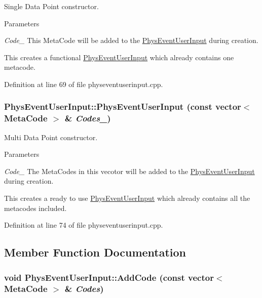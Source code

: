 Single Data Point constructor. 
\begin{DoxyParams}{Parameters}
\item[{\em Code\_\-}]This MetaCode will be added to the \hyperlink{classPhysEventUserInput}{PhysEventUserInput} during creation.\end{DoxyParams}
This creates a functional \hyperlink{classPhysEventUserInput}{PhysEventUserInput} which already contains one metacode. 

Definition at line 69 of file physeventuserinput.cpp.\hypertarget{classPhysEventUserInput_a0a9bd99d8db6f171ef3c87bd417ccc4a}{
\subsubsection[{PhysEventUserInput}]{\setlength{\rightskip}{0pt plus 5cm}PhysEventUserInput::PhysEventUserInput (const vector$<$ {\bf MetaCode} $>$ \& {\em Codes\_\-})}}
\label{dc/d0e/classPhysEventUserInput_a0a9bd99d8db6f171ef3c87bd417ccc4a}


Multi Data Point constructor. 
\begin{DoxyParams}{Parameters}
\item[{\em Code\_\-}]The MetaCodes in this vecotor will be added to the \hyperlink{classPhysEventUserInput}{PhysEventUserInput} during creation.\end{DoxyParams}
This creates a ready to use \hyperlink{classPhysEventUserInput}{PhysEventUserInput} which already contains all the metacodes included. 

Definition at line 74 of file physeventuserinput.cpp.

\subsection{Member Function Documentation}
\hypertarget{classPhysEventUserInput_aecac02073d3296c71e0ae4534daf8dce}{
\subsubsection[{AddCode}]{\setlength{\rightskip}{0pt plus 5cm}void PhysEventUserInput::AddCode (const vector$<$ {\bf MetaCode} $>$ \& {\em Codes})}}
\label{dc/d0e/classPhysEventUserInput_aecac02073d3296c71e0ae4534daf8dce}


